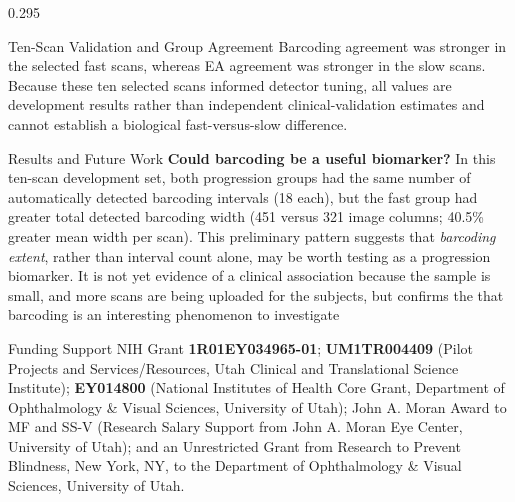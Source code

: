 \documentclass[final]{beamer}
\begin{document}
\begin{frame}[t]
\begin{columns}[t,totalwidth=\dimexpr\paperwidth-4cm\relax]
\begin{column}{0.295\textwidth}
\begin{block}{Ten-Scan Validation and Group Agreement}
    \vspace{0.3cm}
    \justifying
    Barcoding agreement was stronger in the selected fast scans, whereas EA
    agreement was stronger in the slow scans. Because these ten selected scans
    informed detector tuning, all values are development results rather than
    independent clinical-validation estimates and cannot establish a biological
    fast-versus-slow difference.
  \end{block}
  \vspace{1.0cm}
  \begin{block}{Results and Future Work}
    \vspace{0.3cm}
    \textbf{Could barcoding be a useful biomarker?} In this ten-scan
    development set, both progression groups had the same number of
    automatically detected barcoding intervals (18 each), but the fast group
    had greater total detected barcoding width (451 versus 321 image columns;
    40.5\% greater mean width per scan). This preliminary pattern suggests that
    \emph{barcoding extent}, rather than interval count alone, may be worth
    testing as a progression biomarker. It is not yet evidence of a clinical
    association because the sample is small, and more scans are being uploaded for the subjects, but confirms the that barcoding is an interesting phenomenon to investigate
  \end{block}
  \vspace{1.0cm}
  \begin{block}{Funding Support}
    {%
    NIH Grant \textbf{1R01EY034965-01}; \textbf{UM1TR004409} (Pilot Projects
    and Services/Resources, Utah Clinical and Translational Science Institute);
    \textbf{EY014800} (National Institutes of Health Core Grant, Department of
    Ophthalmology \& Visual Sciences, University of Utah); John A. Moran Award
    to MF and SS-V (Research Salary Support from John A. Moran Eye Center,
    University of Utah); and an Unrestricted Grant from Research to Prevent
    Blindness, New York, NY, to the Department of Ophthalmology \& Visual
    Sciences, University of Utah.
    }
  \end{block}

\end{column}

\end{columns}

\vfill

\end{frame}
\end{document}
